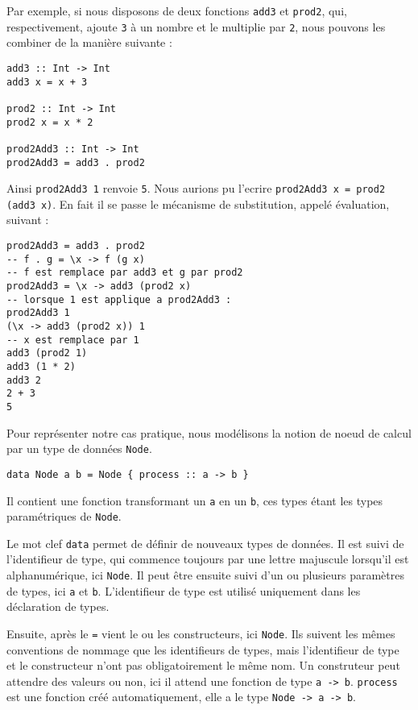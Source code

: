 \documentclass{llncs}
\begin{document}
Par exemple, si nous disposons de deux fonctions \lstinline{add3} et \lstinline{prod2},
qui, respectivement, ajoute \lstinline{3} à un nombre et le multiplie par \lstinline{2},
nous pouvons les combiner de la manière suivante :
\begin{lstlisting}
add3 :: Int -> Int
add3 x = x + 3

prod2 :: Int -> Int
prod2 x = x * 2

prod2Add3 :: Int -> Int
prod2Add3 = add3 . prod2
\end{lstlisting}

Ainsi \lstinline{prod2Add3 1} renvoie \lstinline{5}.
Nous aurions pu l'ecrire \lstinline{prod2Add3 x = prod2 (add3 x)}.
En fait il se passe le mécanisme de substitution, appelé évaluation, suivant :
\begin{lstlisting}
prod2Add3 = add3 . prod2
-- f . g = \x -> f (g x)
-- f est remplace par add3 et g par prod2
prod2Add3 = \x -> add3 (prod2 x)
-- lorsque 1 est applique a prod2Add3 :
prod2Add3 1
(\x -> add3 (prod2 x)) 1
-- x est remplace par 1
add3 (prod2 1)
add3 (1 * 2)
add3 2
2 + 3
5
\end{lstlisting}

Pour représenter notre cas pratique, nous modélisons la notion de noeud de calcul
par un type de données \lstinline{Node}.
\begin{lstlisting}
data Node a b = Node { process :: a -> b }
\end{lstlisting}

Il contient une fonction transformant un \lstinline{a} en un \lstinline{b}, ces
types étant les types paramétriques de \lstinline{Node}.

Le mot clef \lstinline{data} permet de définir de nouveaux types de données.
Il est suivi de l'identifieur de type, qui commence toujours par une lettre
majuscule lorsqu'il est alphanumérique, ici \lstinline{Node}.
Il peut être ensuite suivi d'un ou plusieurs paramètres de types, ici
\lstinline{a} et \lstinline{b}.
L'identifieur de type est utilisé uniquement dans les déclaration de types.

Ensuite, après le \lstinline{=} vient le ou les constructeurs, ici \lstinline{Node}.
Ils suivent les mêmes conventions de nommage que les identifieurs de types, mais
l'identifieur de type et le constructeur n'ont pas obligatoirement le même nom.
Un construteur peut attendre des valeurs ou non, ici il attend une fonction de
type \lstinline{a -> b}.
\lstinline{process} est une fonction créé automatiquement, elle a le type
\lstinline{Node -> a -> b}.
\end{document}
